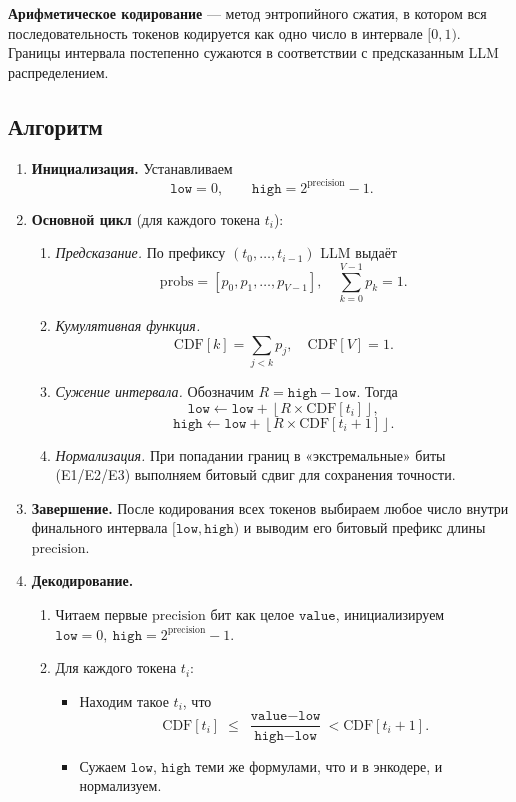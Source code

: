 \documentclass[a4paper,11pt]{article}
\begin{document}
\textbf{Арифметическое кодирование} — метод энтропийного сжатия, в котором вся последовательность токенов кодируется как одно число в интервале \([0,1)\). Границы интервала постепенно сужаются в соответствии с предсказанным LLM распределением.

\subsection*{Алгоритм}

\begin{enumerate}
  \item \textbf{Инициализация.} Устанавливаем
  \[
    \texttt{low} = 0,\qquad
    \texttt{high} = 2^{\text{precision}} - 1.
  \]

  \item \textbf{Основной цикл} (для каждого токена \(t_i\)):
  \begin{enumerate}
    \item \emph{Предсказание.} По префиксу \((t_0,\dots,t_{i-1})\) LLM выдаёт
    \[
      \text{probs}=[p_0, p_1, \dots, p_{V-1}],\quad \sum_{k=0}^{V-1}p_k=1.
    \]

    \item \emph{Кумулятивная функция.}
    \[
      \text{CDF}[k] = \sum_{j<k} p_j,\quad \text{CDF}[V]=1.
    \]

    \item \emph{Сужение интервала.} Обозначим \(R = \texttt{high}-\texttt{low}\). Тогда
    \[
      \texttt{low}  \leftarrow \texttt{low}
        + \left\lfloor R \times \text{CDF}[t_i]\right\rfloor,
    \]
    \[
      \texttt{high} \leftarrow \texttt{low}
        + \left\lfloor R \times \text{CDF}[t_i+1]\right\rfloor.
    \]

    \item \emph{Нормализация.} При попадании границ в «экстремальные» биты (E1/E2/E3) выполняем битовый сдвиг для сохранения точности.
  \end{enumerate}

  \item \textbf{Завершение.} После кодирования всех токенов выбираем любое число внутри финального интервала \([\texttt{low},\texttt{high})\) и выводим его битовый префикс длины \(\text{precision}\).

  \item \textbf{Декодирование.}
  \begin{enumerate}
    \item Читаем первые \(\text{precision}\) бит как целое \(\texttt{value}\), инициализируем
    \(\texttt{low}=0,\ \texttt{high}=2^{\text{precision}}-1\).
    \item Для каждого токена \(t_i\):
    \begin{itemize}
      \item Находим такое \(t_i\), что
      \[
        \text{CDF}[t_i] \;\le\;\frac{\texttt{value}-\texttt{low}}{\texttt{high}-\texttt{low}}
        < \text{CDF}[t_i+1].
      \]
      \item Сужаем \(\texttt{low}\), \(\texttt{high}\) теми же формулами, что и в энкодере, и нормализуем.
    \end{itemize}
  \end{enumerate}
\end{enumerate}
\end{document}
